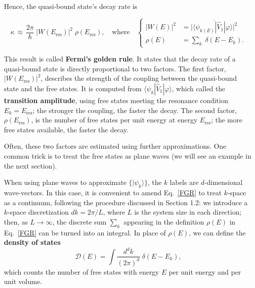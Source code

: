 \documentclass[pra,12pt]{revtex4}
\begin{document}
Hence, the quasi-bound state's decay rate is
\begin{framed}
  \begin{equation}
    \kappa
    \,\approx\, \frac{2\pi}{\hbar} \;
    \big|W(E_\mathrm{res})\big|^2 \; \rho(E_{\mathrm{res}}),
    \quad \mathrm{where} \quad \left\{
    \begin{aligned}
      \big|W(E)\big|^2
      &= \overline{\Big| \langle\psi_{k(E)}| \hat{V}_1|\varphi\rangle\Big|^2} \\
      \rho(E) &= \sum_k \; \delta(E-E_k).
    \end{aligned}\right.
    \label{FGR}
  \end{equation}
\end{framed}
\vskip -0.12in
This result is called \textbf{Fermi's golden rule}.  It states that
the decay rate of a quasi-bound state is directly proportional to two
factors.  The first factor, $|W(E_\mathrm{res})|^2$, describes the
strength of the coupling between the quasi-bound state and the free
states.  It is computed from $\langle\psi_{k}|
\hat{V}_1|\varphi\rangle$, which called the \textbf{transition
  amplitude}, using free states meeting the resonance condition $E_k =
E_{\mathrm{res}}$; the stronger the coupling, the faster the decay.
The second factor, $\rho(E_{\mathrm{res}})$, is the number of free
states per unit energy at energy $E_{\mathrm{res}}$; the more free
states available, the faster the decay.

Often, these two factors are estimated using further approximations.
One common trick is to treat the free states as plane waves (we will
see an example in the next section).

When using plane waves to approximate $\{|\psi_k\rangle\}$, the $k$
labels are $d$-dimensional wave-vectors.  In this case, it is
convenient to amend Eq.~\eqref{FGR} to treat $k$-space as a continuum,
following the procedure discussed in Section 1.2: we introduce a
$k$-space discretization $dk = 2\pi/L$, where $L$ is the system size
in each direction; then, as $L\rightarrow \infty$, the discrete sum
$\sum_k$ appearing in the definition $\rho(E)$ in Eq.~\eqref{FGR} can
be turned into an integral.  In place of $\rho(E)$, we can define the
\textbf{density of states}
\begin{equation}
  \mathcal{D}(E) = \int \frac{d^d k}{(2\pi)^d} \; \delta(E - E_k),
\end{equation}
which counts the number of free states with energy $E$ per unit energy
and per unit volume.
\end{document}
